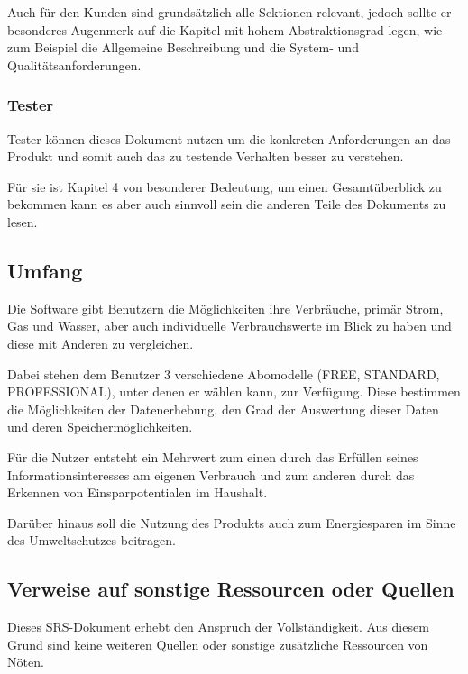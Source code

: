 Auch für den Kunden sind grundsätzlich alle Sektionen relevant, jedoch sollte er besonderes Augenmerk auf die Kapitel mit hohem Abstraktionsgrad legen,
wie zum Beispiel die Allgemeine Beschreibung und die System- und Qualitätsanforderungen.

\subsubsection{Tester}

Tester können dieses Dokument nutzen um die konkreten Anforderungen an das Produkt und somit auch das zu testende Verhalten besser zu verstehen. 

Für sie ist Kapitel 4 von besonderer Bedeutung, um einen Gesamtüberblick zu bekommen kann es aber auch sinnvoll sein die anderen Teile des Dokuments zu lesen.%

\subsection{Umfang}

Die Software gibt Benutzern die Möglichkeiten ihre Verbräuche, primär Strom, Gas und Wasser, aber auch individuelle Verbrauchswerte im Blick zu haben und diese mit Anderen zu vergleichen.


Dabei stehen dem Benutzer 3 verschiedene Abomodelle (FREE, STANDARD, PROFESSIONAL), unter denen er wählen kann, zur Verfügung.
Diese bestimmen die Möglichkeiten der Datenerhebung, den Grad der Auswertung dieser Daten und deren Speichermöglichkeiten.

Für die Nutzer entsteht ein Mehrwert zum einen durch das Erfüllen seines Informationsinteresses am eigenen Verbrauch und zum anderen durch das Erkennen von Einsparpotentialen im Haushalt.

Darüber hinaus soll die Nutzung des Produkts auch zum Energiesparen im Sinne des Umweltschutzes beitragen.

\subsection{Verweise auf sonstige Ressourcen oder Quellen}

Dieses SRS-Dokument erhebt den Anspruch der Vollständigkeit. Aus diesem Grund sind keine weiteren Quellen oder sonstige zusätzliche Ressourcen von Nöten.

